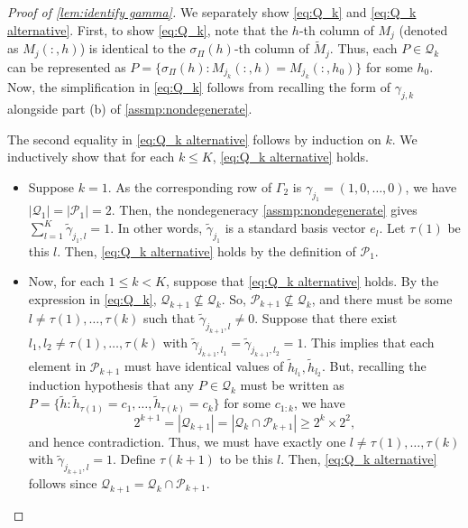 \documentclass[10pt]{article} %
\def\tilde{\widetilde}
\begin{document}
\begin{proof}[Proof of \cref{lem:identify gamma}]
We separately show \eqref{eq:Q_k} and \eqref{eq:Q_k alternative}. First, to show \eqref{eq:Q_k}, note that the $h$-th column of $M_j$ (denoted as $M_j(:, h)$) is identical to the $\sigma_\Pi(h)$-th column of $\tilde{M}_j$. Thus, each $P \in \mathcal{Q}_k$ can be represented as $P = \{\sigma_\Pi(h): M_{j_k}(:, h) = M_{j_k}(:, h_0) \}$ for some $h_0$. Now, the simplification in \eqref{eq:Q_k} follows from recalling the form of $\gamma_{j,k}$ alongside part (b) of \cref{assmp:nondegenerate}.

The second equality in \eqref{eq:Q_k alternative} follows by induction on $k$. We inductively show that for each $k \le K$, \eqref{eq:Q_k alternative} holds. %


\begin{itemize}
    \item Suppose $k=1$. As the corresponding row of $\Gamma_2$ is $\gamma_{j_1} = (1, 0, \ldots, 0)$, we have $|\mathcal{Q}_1| = |\mathcal{P}_1| =2$. Then, the nondegeneracy \cref{assmp:nondegenerate} gives $\sum_{l=1}^K \tilde{\gamma}_{j_1,l} = 1.$ In other words, $\tilde{\gamma}_{j_1}$ is a standard basis vector $e_l$. Let $\tau(1)$ be this $l$. Then, \eqref{eq:Q_k alternative} holds by the definition of $\mathcal{P}_1$.
    
    \item Now, for each $1 \le k < K$, suppose that \eqref{eq:Q_k alternative} holds. By the expression in \eqref{eq:Q_k}, $\mathcal{Q}_{k+1} \not\subseteq \mathcal{Q}_{k}$. So, $\mathcal{P}_{k+1} \not\subseteq \mathcal{Q}_k$, and there must be some $l \neq \tau(1), \ldots, \tau(k)$ such that $\tilde{\gamma}_{j_{k+1}, l} \neq 0$. Suppose that there exist $l_1, l_2 \neq \tau(1), \ldots, \tau(k)$ with $\tilde{\gamma}_{j_{k+1}, l_1} = \tilde{\gamma}_{j_{k+1}, l_2} = 1$. This implies that each element in $\mathcal{P}_{k+1}$ must have identical values of $\tilde{h}_{l_1}, \tilde{h}_{l_2}$. But, recalling the induction hypothesis that any $P \in \mathcal{Q}_k$ must be written as $P = \{\tilde{h}: \tilde{h}_{\tau(1)}=c_1, \ldots, \tilde{h}_{\tau(k)}=c_k\}$ for some $c_{1:k}$, we have $$2^{k+1} = |\mathcal{Q}_{k+1}| = |\mathcal{Q}_k \cap \mathcal{P}_{k+1}| \ge 2^{k} \times 2^2,$$
    and hence contradiction. Thus, we must have exactly one $l \neq \tau(1), \ldots, \tau(k)$ with $\tilde{\gamma}_{j_{k+1}, l} =1$. Define $\tau(k+1)$ to be this $l$. Then, \eqref{eq:Q_k alternative} follows since $\mathcal{Q}_{k+1} = \mathcal{Q}_k \cap \mathcal{P}_{k+1}$.
 
\end{itemize}
\end{proof}
\end{document}
